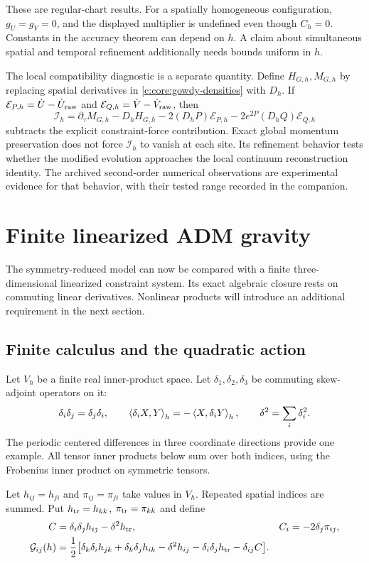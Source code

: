 These are regular-chart results. For a spatially homogeneous
configuration, $g_U=g_V=0$, and the displayed multiplier is
undefined even though $C_h=0$. Constants in the accuracy theorem
can depend on $h$. A claim about simultaneous spatial and temporal
refinement additionally needs bounds uniform in $h$.

The local compatibility diagnostic is a separate quantity. Define
$H_{G,h},M_{G,h}$ by replacing spatial derivatives in
\eqref{c:core:gowdy-densities} with $D_h$. If
$\mathcal E_{P,h}=\dot U-\dot U_{\rm raw}$ and
$\mathcal E_{Q,h}=\dot V-\dot V_{\rm raw}$, then
\[
 \mathcal I_h=\partial_\tau M_{G,h}-D_hH_{G,h}
 -2(D_hP)\mathcal E_{P,h}
 -2e^{2P}(D_hQ)\mathcal E_{Q,h}
\]
subtracts the explicit constraint-force contribution. Exact global
momentum preservation does not force $\mathcal I_h$ to vanish at each
site. Its refinement behavior tests whether the modified evolution
approaches the local continuum reconstruction identity. The archived
second-order numerical observations are experimental evidence for
that behavior, with their tested range recorded in the companion.



\section{Finite linearized ADM gravity}
\label{c:core:adm}

The symmetry-reduced model can now be compared with a finite
three-dimensional linearized constraint system. Its exact algebraic
closure rests on commuting linear derivatives. Nonlinear products
will introduce an additional requirement in the next section.

\subsection{Finite calculus and the quadratic action}

Let $V_h$ be a finite real inner-product space. Let
$\delta_1,\delta_2,\delta_3$ be commuting skew-adjoint operators on it:
\[
 \delta_i\delta_j=\delta_j\delta_i,
 \qquad\left\langle\delta_iX,Y\right\rangle_h=-\left\langle X,\delta_iY\right\rangle_h,
 \qquad\delta^2=\sum_i\delta_i^2.
\]
The periodic centered differences in three coordinate directions
provide one example. All tensor inner products below sum over both
indices, using the Frobenius inner product on symmetric tensors.

Let $h_{ij}=h_{ji}$ and $\pi_{ij}=\pi_{ji}$ take values in $V_h$.
Repeated spatial indices are summed. Put $h_{\rm tr}=h_{kk}$,
$\pi_{\rm tr}=\pi_{kk}$ and define
\begin{align}
 C&=\delta_i\delta_jh_{ij}-\delta^2h_{\rm tr},
 &C_i&=-2\delta_j\pi_{ij},\nonumber\\
 \mathcal G_{ij}(h)&=\frac12\big[
 \delta_k\delta_ih_{jk}+\delta_k\delta_jh_{ik}
 -\delta^2h_{ij}-\delta_i\delta_jh_{\rm tr}
 -\delta_{ij}C\big].
 \label{c:core:adm-operators}
\end{align}

